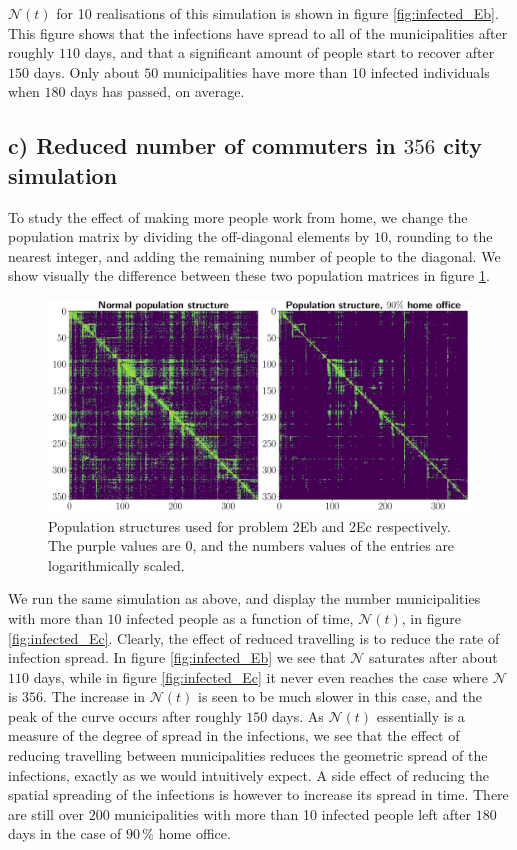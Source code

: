 $\mathcal{N}(t)$ for 10 realisations of this simulation is shown in figure \ref{fig:infected_Eb}. This figure shows that the infections have spread to all of the municipalities after roughly $110$ days, and that a significant amount of people start to recover after $150$ days. Only about $50$ municipalities have more than $10$ infected individuals when $180$ days has passed, on average.    

\subsection{c) Reduced number of commuters in $356$ city simulation}

To study the effect of making more people work from home, we change the population matrix by dividing the off-diagonal elements by $10$, rounding to the nearest integer, and adding the remaining number of people to the diagonal. We show visually the difference between these two population matrices in figure \ref{fig:matrices}.  

\begin{figure}[htb]
	\centering
	\includegraphics[width=0.9\columnwidth]{../fig/matrices.pdf}
	\caption{Population structures used for problem 2Eb and 2Ec respectively. The purple values are 0, and the numbers values of the entries are logarithmically scaled.}
	\label{fig:matrices}
\end{figure}

We run the same simulation as above, and display the number municipalities with more than $10$ infected people as a function of time, $\mathcal{N}(t)$,  in figure \ref{fig:infected_Ec}. Clearly, the effect of reduced travelling is to reduce the rate of infection spread. In figure \ref{fig:infected_Eb} we see that $\mathcal{N}$ saturates after about $110$ days, while in figure \ref{fig:infected_Ec} it never even reaches the case where $\mathcal{N}$ is $356$. The increase in $\mathcal{N}(t)$ is seen to be much slower in this case, and the peak of the curve occurs after roughly $150$ days. As $\mathcal{N}(t)$ essentially is a measure of the degree of spread in the infections, we see that the effect of reducing travelling between municipalities reduces the geometric spread of the infections, exactly as we would intuitively expect. A side effect of reducing the spatial spreading of the infections is however to increase its spread in time. There are still over $200$ municipalities with more than 10 infected people left after $180$ days in the case of $90 \, \%$ home office. 

